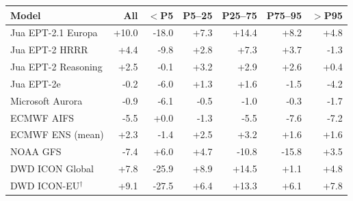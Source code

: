 \begin{tabular}{lrrrrrr}
\toprule
Model & All & $<$P5 & P5--25 & P25--75 & P75--95 & $>$P95 \\
\midrule
Jua EPT-2.1 Europa & +10.0 & -18.0 & +7.3 & +14.4 & +8.2 & +4.8 \\
Jua EPT-2 HRRR & +4.4 & -9.8 & +2.8 & +7.3 & +3.7 & -1.3 \\
Jua EPT-2 Reasoning & +2.5 & -0.1 & +3.2 & +2.9 & +2.6 & +0.4 \\
Jua EPT-2e & -0.2 & -6.0 & +1.3 & +1.6 & -1.5 & -4.2 \\
Microsoft Aurora & -0.9 & -6.1 & -0.5 & -1.0 & -0.3 & -1.7 \\
ECMWF AIFS & -5.5 & +0.0 & -1.3 & -5.5 & -7.6 & -7.2 \\
ECMWF ENS (mean) & +2.3 & -1.4 & +2.5 & +3.2 & +1.6 & +1.6 \\
NOAA GFS & -7.4 & +6.0 & +4.7 & -10.8 & -15.8 & +3.5 \\
DWD ICON Global & +7.8 & -25.9 & +8.9 & +14.5 & +1.1 & +4.8 \\
DWD ICON-EU$^{\dagger}$ & +9.1 & -27.5 & +6.4 & +13.3 & +6.1 & +7.8 \\
\bottomrule
\end{tabular}

